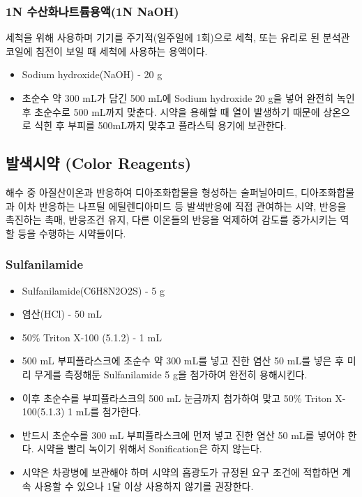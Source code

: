 \documentclass[
]{book}
\providecommand{\tightlist}{%
  \setlength{\itemsep}{0pt}\setlength{\parskip}{0pt}}
\begin{document}
\hypertarget{n-uxc218uxc0b0uxd654uxb098uxd2b8uxb968uxc6a9uxc5611n-naoh}{%
\subsubsection{1N 수산화나트륨용액(1N NaOH)}\label{n-uxc218uxc0b0uxd654uxb098uxd2b8uxb968uxc6a9uxc5611n-naoh}}

세척을 위해 사용하며 기기를 주기적(일주일에 1회)으로 세척, 또는 유리로 된 분석관 코일에 침전이 보일 때 세척에 사용하는 용액이다.

\begin{itemize}
\tightlist
\item
  Sodium hydroxide(NaOH) - 20 g
\item
  초순수 약 300 mL가 담긴 500 mL에 Sodium hydroxide 20 g을 넣어 완전히 녹인 후 초순수로 500 mL까지 맞춘다. 시약을 용해할 때 열이 발생하기 때문에 상온으로 식힌 후 부피를 500mL까지 맞추고 플라스틱 용기에 보관한다.
\end{itemize}

\hypertarget{uxbc1cuxc0c9uxc2dcuxc57d-color-reagents}{%
\subsection{발색시약 (Color Reagents)}\label{uxbc1cuxc0c9uxc2dcuxc57d-color-reagents}}

해수 중 아질산이온과 반응하여 디아조화합물을 형성하는 술퍼닐아미드, 디아조화합물과 이차 반응하는 나프틸 에틸렌디아미드 등 발색반응에 직접 관여하는 시약, 반응을 촉진하는 촉매, 반응조건 유지, 다른 이온들의 반응을 억제하여 감도를 증가시키는 역할 등을 수행하는 시약들이다.

\hypertarget{sulfanilamide}{%
\subsubsection{Sulfanilamide}\label{sulfanilamide}}

\begin{itemize}
\tightlist
\item
  Sulfanilamide(C6H8N2O2S) - 5 g
\item
  염산(HCl) - 50 mL
\item
  50\% Triton X-100 (5.1.2) - 1 mL
\item
  500 mL 부피플라스크에 초순수 약 300 mL를 넣고 진한 염산 50 mL를 넣은 후 미리 무게를 측정해둔 Sulfanilamide 5 g을 첨가하여 완전히 용해시킨다.\\
\item
  이후 초순수를 부피플라스크의 500 mL 눈금까지 첨가하여 맞고 50\% Triton X-100(5.1.3) 1 mL를 첨가한다.
\item
  반드시 초순수를 300 mL 부피플라스크에 먼저 넣고 진한 염산 50 mL를 넣어야 한다. 시약을 빨리 녹이기 위해서 Sonification은 하지 않는다.
\item
  시약은 차광병에 보관해야 하며 시약의 흡광도가 규정된 요구 조건에 적합하면 계속 사용할 수 있으나 1달 이상 사용하지 않기를 권장한다.
\end{itemize}
\end{document}
